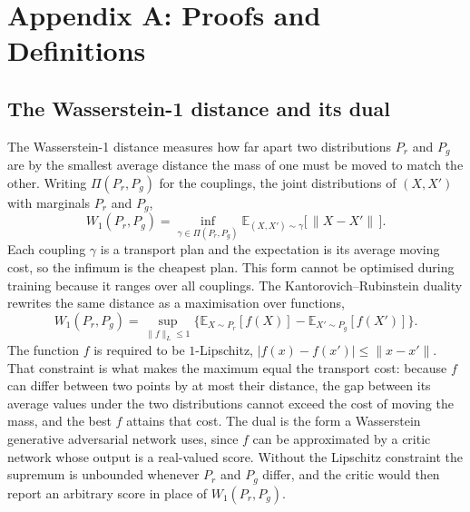 \appendix
\renewcommand{\theHchapter}{\Alph{chapter}}
\chapter{Appendix A: Proofs and Definitions}

\section{The Wasserstein-1 distance and its dual}\label{app:wasserstein}

The Wasserstein-1 distance measures how far apart two distributions $P_r$ and $P_g$ are by the smallest average distance the mass of one must be moved to match the other. Writing $\Pi(P_r,P_g)$ for the couplings, the joint distributions of $(X,X')$ with marginals $P_r$ and $P_g$,
\begin{equation}
W_1(P_r,P_g)=\inf_{\gamma\in\Pi(P_r,P_g)}\mathbb{E}_{(X,X')\sim\gamma}\bigl[\,\|X-X'\|\,\bigr].
\label{eq:wasserstein-primal}
\end{equation}
Each coupling $\gamma$ is a transport plan and the expectation is its average moving cost, so the infimum is the cheapest plan. This form cannot be optimised during training because it ranges over all couplings. The Kantorovich--Rubinstein duality rewrites the same distance as a maximisation over functions,
\begin{equation}
W_1(P_r,P_g)=\sup_{\|f\|_L\le 1}\bigl\{\mathbb{E}_{X\sim P_r}[f(X)]-\mathbb{E}_{X'\sim P_g}[f(X')]\bigr\}.
\label{eq:wasserstein-dual}
\end{equation}
The function $f$ is required to be $1$-Lipschitz, $|f(x)-f(x')|\le\|x-x'\|$. That constraint is what makes the maximum equal the transport cost: because $f$ can differ between two points by at most their distance, the gap between its average values under the two distributions cannot exceed the cost of moving the mass, and the best $f$ attains that cost. The dual is the form a Wasserstein generative adversarial network uses, since $f$ can be approximated by a critic network whose output is a real-valued score. Without the Lipschitz constraint the supremum is unbounded whenever $P_r$ and $P_g$ differ, and the critic would then report an arbitrary score in place of $W_1(P_r,P_g)$.

